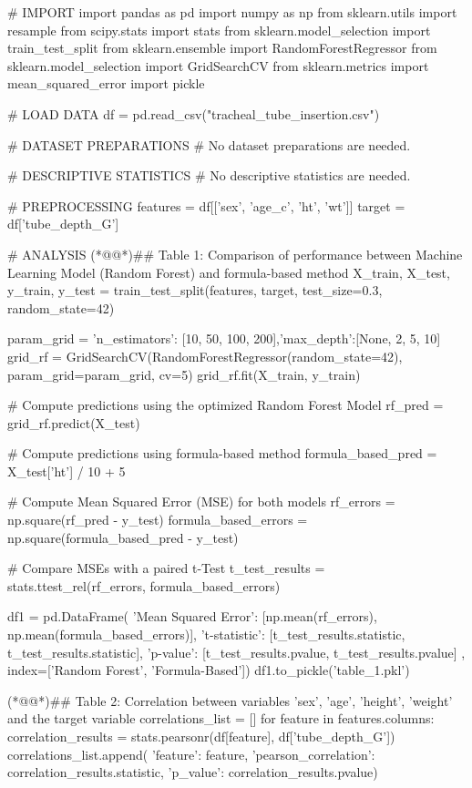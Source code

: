 \documentclass[11pt]{article}
\begin{document}
\begin{python}

# IMPORT
import pandas as pd
import numpy as np
from sklearn.utils import resample
from scipy.stats import stats
from sklearn.model_selection import train_test_split
from sklearn.ensemble import RandomForestRegressor
from sklearn.model_selection import GridSearchCV
from sklearn.metrics import mean_squared_error
import pickle

# LOAD DATA
df = pd.read_csv("tracheal_tube_insertion.csv")

# DATASET PREPARATIONS
# No dataset preparations are needed.

# DESCRIPTIVE STATISTICS
# No descriptive statistics are needed.

# PREPROCESSING
features = df[['sex', 'age_c', 'ht', 'wt']]
target = df['tube_depth_G']

# ANALYSIS
(*@@*)## Table 1: Comparison of performance between Machine Learning Model (Random Forest) and formula-based method
X_train, X_test, y_train, y_test = train_test_split(features, target, test_size=0.3, random_state=42)

param_grid = {'n_estimators': [10, 50, 100, 200],'max_depth':[None, 2, 5, 10]}
grid_rf = GridSearchCV(RandomForestRegressor(random_state=42), param_grid=param_grid, cv=5)
grid_rf.fit(X_train, y_train)

# Compute predictions using the optimized Random Forest Model
rf_pred = grid_rf.predict(X_test)

# Compute predictions using formula-based method
formula_based_pred = X_test['ht'] / 10 + 5

# Compute Mean Squared Error (MSE) for both models
rf_errors = np.square(rf_pred - y_test)
formula_based_errors = np.square(formula_based_pred - y_test)

# Compare MSEs with a paired t-Test
t_test_results = stats.ttest_rel(rf_errors, formula_based_errors)

df1 = pd.DataFrame({
    'Mean Squared Error': [np.mean(rf_errors), np.mean(formula_based_errors)],
    't-statistic': [t_test_results.statistic, t_test_results.statistic],
    'p-value': [t_test_results.pvalue, t_test_results.pvalue]
}, index=['Random Forest', 'Formula-Based'])
df1.to_pickle('table_1.pkl')

(*@@*)## Table 2: Correlation between variables 'sex', 'age', 'height', 'weight' and the target variable
correlations_list = []
for feature in features.columns:
    correlation_results = stats.pearsonr(df[feature], df['tube_depth_G'])
    correlations_list.append({
        'feature': feature, 
        'pearson_correlation': correlation_results.statistic, 
        'p_value': correlation_results.pvalue})


\end{python}
\end{document}
